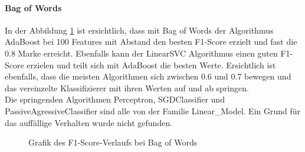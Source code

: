 \paragraph{Bag of Words}
In der Abbildung \cref{abb:bow-f1} ist ersichtlich, dass mit \glqq Bag of Words\grqq{} der Algorithmus AdaBoost bei 100 Features mit Abstand den besten F1-Score erzielt und fast die 0.8 Marke erreicht.
Ebenfalls kann der LinearSVC Algorithmus einen guten F1-Score erzielen und teilt sich mit AdaBoost die besten Werte.
Ersichtlich ist ebenfalls, dass die meisten Algorithmen sich zwischen 0.6 und 0.7 bewegen und das vereinzelte Klassifizierer mit ihren Werten auf und ab springen.\\
Die springenden Algorithmen Perceptron, SGDClassifier und PassiveAgressiveClassifier sind alle von der Familie \glqq Linear\_Model\grqq{}. Ein Grund für das auffällige Verhalten wurde nicht gefunden.
\begin{figure}[H]	
	\setlength{\fboxsep}{0.3pt} 
	\setlength{\fboxrule}{0.3pt} 
	\caption{Grafik des F1-Score-Verlaufs bei Bag of Words}
	\label{abb:bow-f1}
\end{figure}

